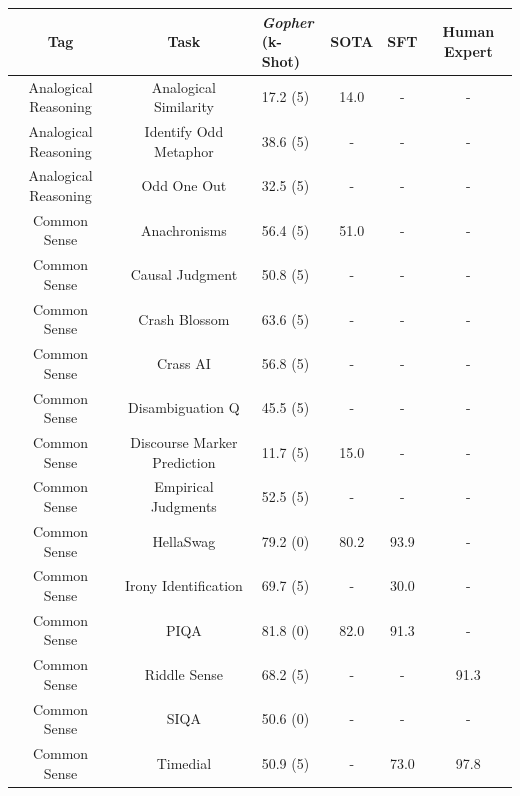 \documentclass[11pt, a4paper, logo, internal, copyright, nonumbering]{deepmind}
\newcommand{\gopher}{\textit{Gopher}\xspace}
\begin{document}
\clearpage
\begin{center}
\small
\begin{longtable}{cclccc}
\toprule
Tag &                                  Task & \shortstack{\gopher \\(k-Shot)} &  SOTA &   SFT & Human Expert \\
\midrule
   Analogical Reasoning &                 Analogical Similarity &   17.2 (5) &  14.0 &   - &          - \\
   Analogical Reasoning &                 Identify Odd Metaphor &   38.6 (5) &   - &   - &          - \\
   Analogical Reasoning &                           Odd One Out &   32.5 (5) &   - &   - &          - \\
           Common Sense &                        Anachronisms &   56.4 (5) &  51.0 &   - &          - \\
           Common Sense &                       Causal Judgment &   50.8 (5) &   - &   - &          - \\
           Common Sense &                         Crash Blossom &   63.6 (5) &   - &   - &          - \\
           Common Sense &                              Crass AI &   56.8 (5) &   - &   - &          - \\
           Common Sense &                      Disambiguation Q &   45.5 (5) &   - &   - &          - \\
           Common Sense &         Discourse Marker Prediction &   11.7 (5) &  15.0 &   - &          - \\
           Common Sense &                   Empirical Judgments &   52.5 (5) &   - &   - &          - \\
           Common Sense &                            HellaSwag &   79.2 (0) &  80.2 &  93.9 &          -  \\
           Common Sense &                  Irony Identification &   69.7 (5) &   - &  30.0 &          - \\
           Common Sense &                                 PIQA &   81.8 (0) &  82.0 &  91.3 &          -  \\
           Common Sense &                          Riddle Sense &   68.2 (5) &   - &   - &         91.3 \\
           Common Sense &                                 SIQA &   50.6 (0) &   - &   - &          -  \\
           Common Sense &                              Timedial &   50.9 (5) &   - &  73.0 &         97.8 \\

\end{longtable}
\end{center}
\end{document}
